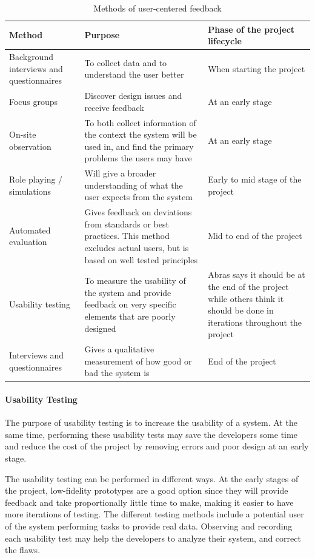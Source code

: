 \begin{table}[H]
\begin{tabular}{|p{5cm} | p{5cm} | p{5cm} |}
\hline
\textbf{Method} & \textbf{Purpose} & \textbf{Phase of the project lifecycle} \\ \hline
Background interviews and questionnaires & To collect data and to understand the user better & When starting the project \\ \hline
Focus groups & Discover design issues and receive feedback & At an early stage \\ \hline
On-site observation & To both collect information of the context the system will be used in, and find the primary problems the users may have & At an early stage \\ \hline
Role playing / simulations & Will give a broader understanding of what the user expects from the system & Early to mid stage of the project \\ \hline
Automated evaluation & Gives feedback on deviations from standards or best practices. This method excludes actual users, but is based on well tested principles & Mid to end of the project \\ \hline
Usability testing & To measure the usability of the system and provide feedback on very specific elements that are poorly designed & Abras\cite{abrasusercentereddesign} says it should be at the end of the project while others\cite{schneidermanusercentered} think it should be done in iterations throughout the project \\ \hline
Interviews and questionnaires & Gives a qualitative measurement of how good or bad the system is & End of the project \\ \hline
\end{tabular}
\caption{Methods of user-centered feedback}
\label{table:designduringlifecycle}
\end{table}


\paragraph{Usability Testing}
The purpose of usability testing is to increase the usability of a system. At the same time, performing these usability tests may save the developers some time and reduce the cost of the project by removing errors and poor design at an early stage\cite{dumas1995practical}.

The usability testing can be performed in different ways\cite{schneidermanusercentered}. At the early stages of the project, low-fidelity prototypes are a good option since they will provide feedback and take proportionally little time to make, making it easier to have more iterations of testing. The different testing methods include a potential user of the system performing tasks to provide real data. Observing and recording each usability test may help the developers to analyze their system, and correct the flaws\cite{dumas1995practical}. 

